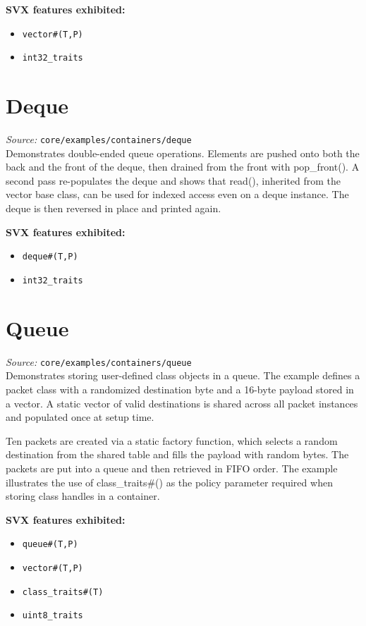 \documentclass[11pt,letterpaper]{report}
\begin{document}
\textbf{SVX features exhibited:}

\begin{itemize}
  \item \texttt{vector\#(T,P)}
  \item \texttt{int32\_traits}
\end{itemize}
\section{Deque}

\textit{Source:} \texttt{core/examples/containers/deque}\\

Demonstrates double-ended queue operations. Elements are pushed onto both the back and the front of the deque, then drained from the front with pop\_front(). A second pass re-populates the deque and shows that read(), inherited from the vector base class, can be used for indexed access even on a deque instance. The deque is then reversed in place and printed again.

\textbf{SVX features exhibited:}

\begin{itemize}
  \item \texttt{deque\#(T,P)}
  \item \texttt{int32\_traits}
\end{itemize}
\section{Queue}

\textit{Source:} \texttt{core/examples/containers/queue}\\

Demonstrates storing user-defined class objects in a queue. The example defines a packet class with a randomized destination byte and a 16-byte payload stored in a vector. A static vector of valid destinations is shared across all packet instances and populated once at setup time.

Ten packets are created via a static factory function, which selects a random destination from the shared table and fills the payload with random bytes. The packets are put into a queue and then retrieved in FIFO order. The example illustrates the use of class\_traits\#() as the policy parameter required when storing class handles in a container.

\textbf{SVX features exhibited:}

\begin{itemize}
  \item \texttt{queue\#(T,P)}
  \item \texttt{vector\#(T,P)}
  \item \texttt{class\_traits\#(T)}
  \item \texttt{uint8\_traits}
\end{itemize}
\end{document}
